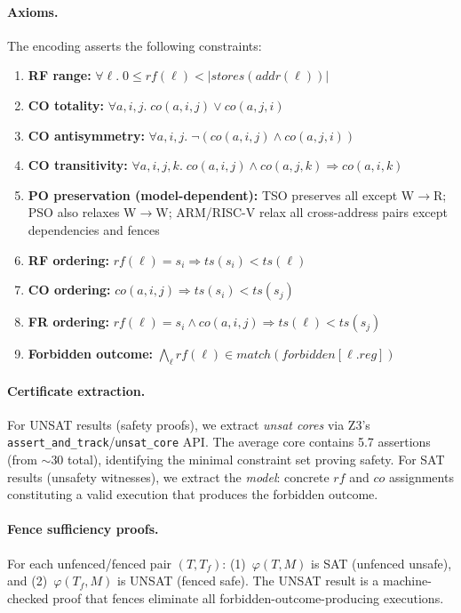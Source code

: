 \documentclass[11pt]{article}
\begin{document}
\paragraph{Axioms.}
The encoding asserts the following constraints:
\begin{enumerate}[nosep]
  \item \textbf{RF range:} $\forall \ell.\; 0 \le \mathit{rf}(\ell) < |\mathit{stores}(\mathit{addr}(\ell))|$
  \item \textbf{CO totality:} $\forall a, i, j.\; \mathit{co}(a,i,j) \lor \mathit{co}(a,j,i)$
  \item \textbf{CO antisymmetry:} $\forall a, i, j.\; \neg(\mathit{co}(a,i,j) \land \mathit{co}(a,j,i))$
  \item \textbf{CO transitivity:} $\forall a, i, j, k.\; \mathit{co}(a,i,j) \land \mathit{co}(a,j,k) \Rightarrow \mathit{co}(a,i,k)$
  \item \textbf{PO preservation (model-dependent):} TSO preserves all
    except W$\to$R; PSO also relaxes W$\to$W; ARM/RISC-V relax all
    cross-address pairs except dependencies and fences
  \item \textbf{RF ordering:} $\mathit{rf}(\ell) = s_i \Rightarrow \mathit{ts}(s_i) < \mathit{ts}(\ell)$
  \item \textbf{CO ordering:} $\mathit{co}(a,i,j) \Rightarrow \mathit{ts}(s_i) < \mathit{ts}(s_j)$
  \item \textbf{FR ordering:} $\mathit{rf}(\ell) = s_i \land \mathit{co}(a,i,j) \Rightarrow \mathit{ts}(\ell) < \mathit{ts}(s_j)$
  \item \textbf{Forbidden outcome:} $\bigwedge_\ell \mathit{rf}(\ell) \in \mathit{match}(\mathit{forbidden}[\ell.\mathit{reg}])$
\end{enumerate}

\paragraph{Certificate extraction.}
For UNSAT results (safety proofs), we extract \emph{unsat cores}
via Z3's \texttt{assert\_and\_track}/\texttt{unsat\_core} API.
The average core contains 5.7 assertions (from $\sim$30 total),
identifying the minimal constraint set proving safety.
For SAT results (unsafety witnesses), we extract the \emph{model}:
concrete $\mathit{rf}$ and $\mathit{co}$ assignments constituting a
valid execution that produces the forbidden outcome.

\paragraph{Fence sufficiency proofs.}
For each unfenced/fenced pair $(T, T_f)$:
(1)~$\varphi(T, M)$ is SAT (unfenced unsafe), and
(2)~$\varphi(T_f, M)$ is UNSAT (fenced safe).
The UNSAT result is a machine-checked proof that fences eliminate
all forbidden-outcome-producing executions.
\end{document}
